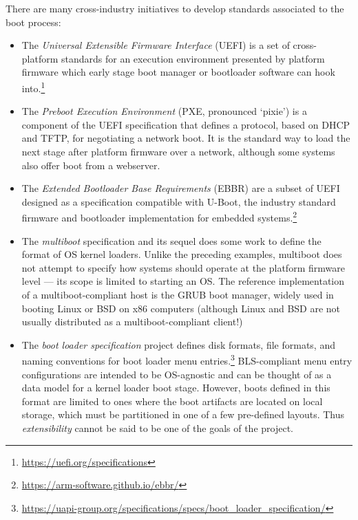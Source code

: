 There are many cross-industry initiatives to develop standards associated to the boot process:
\begin{itemize}
  \item
   The \emph{Universal Extensible Firmware Interface} (UEFI) is a set of cross-platform standards for an execution environment presented by platform firmware which early stage boot manager or bootloader software can hook into.\footnote{\url{https://uefi.org/specifications}}

  \item
    The \emph{Preboot Execution Environment} (PXE, pronounced `pixie') is a component of the UEFI specification that defines a protocol, based on DHCP and TFTP, for negotiating a network boot.
    It is the standard way to load the next stage after platform firmware over a network, although some systems also offer boot from a webserver.

  \item
    The \emph{Extended Bootloader Base Requirements} (EBBR) are a subset of UEFI designed as a specification compatible with U-Boot, the industry standard firmware and bootloader implementation for embedded systems.\footnote{\url{https://arm-software.github.io/ebbr/}}

  \item
    The \emph{multiboot} specification and its sequel does some work to define the format of OS kernel loaders. 
    Unlike the preceding examples, multiboot does not attempt to specify how systems should operate at the platform firmware level --- its scope is limited to starting an OS.
    The reference implementation of a multiboot-compliant host is the GRUB boot manager, widely used in booting Linux or BSD on x86 computers (although Linux and BSD are not usually distributed as a multiboot-compliant client!)

  \item
    The \emph{boot loader specification} project defines disk formats, file formats, and naming conventions for boot loader menu entries.\footnote{\url{https://uapi-group.org/specifications/specs/boot_loader_specification/}} 
    BLS-compliant menu entry configurations are intended to be OS-agnostic and can be thought of as a data model for a kernel loader boot stage.
    However, boots defined in this format are limited to ones where the boot artifacts are located on local storage, which must be partitioned in one of a few pre-defined layouts. 
    Thus \emph{extensibility} cannot be said to be one of the goals of the project.

\end{itemize}

